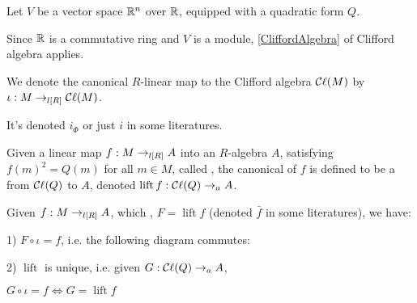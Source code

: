 \begin{example}
  \label{ex:clifford_algebra_v}

  Let $V$ be a vector space $\mathbb R^n$ over $\mathbb R$, equipped with a quadratic form $Q$.
  
  Since $\mathbb R$ is a commutative ring and $V$ is a module, \cref{CliffordAlgebra} of Clifford algebra applies.
\end{example}

\begin{definition}
  \label{iota}
  \leanok

  We denote the canonical $R$-linear map to the Clifford algebra $\mathop{\mathcal{C}\ell}(M)$ by $\iota : M \to_{l[R]} \mathop{\mathcal{C}\ell}(M)$.

  It's denoted $i_\Phi$ or just $i$ in some literatures.

\end{definition}

\begin{definition}
  \label{lift}
  \leanok

  Given a linear map $f : M \to_{l[R]} A$ into an $R$-algebra $A$,
  satisfying $f(m)^2 = Q(m)$ for all $m \in M$,
  called ,
  the canonical  of $f$ is defined to be a  from $\mathop{\mathcal{C}\ell}(Q)$ to $A$,
  denoted $\operatorname{lift} f : \mathop{\mathcal{C}\ell}(Q) \to_{a} A$.

\end{definition}

\begin{theorem}
  \label{univ}
  \leanok

  Given $f : M \to_{l[R]} A$, which , $F = \operatorname{lift} f$ (denoted $\bar{f}$ in some literatures), we have:

  1) $F \circ \iota = f$, i.e. the following diagram commutes:

  \begin{figure}[H]
    \centering
  \end{figure}

  2) $\operatorname{lift}$ is unique, i.e. given $G : \mathop{\mathcal{C}\ell}(Q) \to_{a} A$, 

  $ G \circ \iota = f \iff G = \operatorname{lift} f$

\end{theorem}

